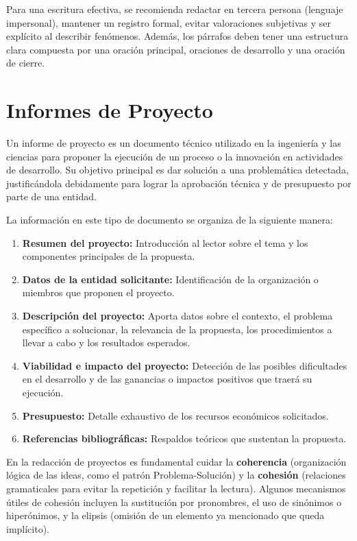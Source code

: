 \documentclass[11pt]{article}
\begin{document}
Para una escritura efectiva, se recomienda redactar en tercera persona (lenguaje impersonal), mantener un registro formal, evitar valoraciones subjetivas y ser explícito al describir fenómenos. Además, los párrafos deben tener una estructura clara compuesta por una oración principal, oraciones de desarrollo y una oración de cierre.

\newpage
\section{Informes de Proyecto}

Un informe de proyecto es un documento técnico utilizado en la ingeniería y las ciencias para proponer la ejecución de un proceso o la innovación en actividades de desarrollo. Su objetivo principal es dar solución a una problemática detectada, justificándola debidamente para lograr la aprobación técnica y de presupuesto por parte de una entidad.

La información en este tipo de documento se organiza de la siguiente manera:
\begin{enumerate}
	\item \textbf{Resumen del proyecto:} Introducción al lector sobre el tema y los componentes principales de la propuesta.
	\item \textbf{Datos de la entidad solicitante:} Identificación de la organización o miembros que proponen el proyecto.
	\item \textbf{Descripción del proyecto:} Aporta datos sobre el contexto, el problema específico a solucionar, la relevancia de la propuesta, los procedimientos a llevar a cabo y los resultados esperados.
	\item \textbf{Viabilidad e impacto del proyecto:} Detección de las posibles dificultades en el desarrollo y de las ganancias o impactos positivos que traerá su ejecución.
	\item \textbf{Presupuesto:} Detalle exhaustivo de los recursos económicos solicitados.
	\item \textbf{Referencias bibliográficas:} Respaldos teóricos que sustentan la propuesta.
\end{enumerate}

En la redacción de proyectos es fundamental cuidar la \textbf{coherencia} (organización lógica de las ideas, como el patrón Problema-Solución) y la \textbf{cohesión} (relaciones gramaticales para evitar la repetición y facilitar la lectura). Algunos mecanismos útiles de cohesión incluyen la sustitución por pronombres, el uso de sinónimos o hiperónimos, y la elipsis (omisión de un elemento ya mencionado que queda implícito).
\end{document}
